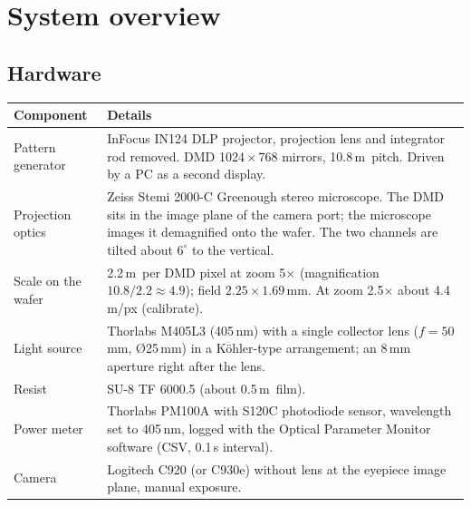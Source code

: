 \documentclass[11pt,a4paper]{article}
\newcommand{\um}{\,\textmu m}
\begin{document}
\section{System overview}
\subsection{Hardware}
\begin{table}[H]\centering\small
\begin{tabularx}{\linewidth}{@{}lX@{}}
\toprule
Component & Details \\
\midrule
Pattern generator & InFocus IN124 DLP projector, projection lens and integrator rod removed.
                    DMD 1024\,$\times$\,768 mirrors, 10.8\um\ pitch. Driven by a PC as a second display. \\
Projection optics & Zeiss Stemi 2000-C Greenough stereo microscope. The DMD sits in the image plane of the camera port;
                    the microscope images it demagnified onto the wafer. The two channels are tilted about $6^\circ$
                    to the vertical. \\
Scale on the wafer & 2.2\um\ per DMD pixel at zoom 5$\times$ (magnification $10.8/2.2 \approx 4.9$);
                     field $2.25\times1.69$\,mm. At zoom 2.5$\times$ about 4.4\um/px (calibrate). \\
Light source & Thorlabs M405L3 (405\,nm) with a single collector lens ($f = 50$\,mm, \O25\,mm) in a
               K\"ohler-type arrangement; an 8\,mm aperture right after the lens. \\
Resist & SU-8 TF 6000.5 (about 0.5\um\ film). \\
Power meter & Thorlabs PM100A with S120C photodiode sensor, wavelength set to 405\,nm, logged with the
              Optical Parameter Monitor software (CSV, 0.1\,s interval). \\
Camera & Logitech C920 (or C930e) without lens at the eyepiece image plane, manual exposure. \\
\bottomrule
\end{tabularx}
\end{table}
\end{document}

